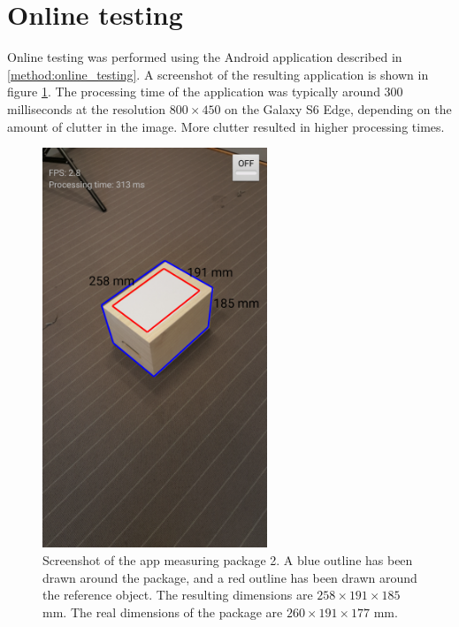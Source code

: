 \section{Online testing} \label{results:online}

Online testing was performed using the Android application described in \ref{method:online_testing}.
A screenshot of the resulting application is shown in figure \ref{fig:screenshot}. %
The processing time of the application was typically around 300 milliseconds at the resolution $800 \times 450$ on the Galaxy S6 Edge, depending on the amount of clutter in the image. 
More clutter resulted in higher processing times.


\begin{figure}[H]
\begin{center}
\includegraphics[width=0.6\textwidth]{figures/screenshot.png}
\end{center}
\caption{Screenshot of the app measuring package 2. A blue outline has been drawn around the package, and a red outline has been drawn around the reference object. The resulting dimensions are $258 \times 191 \times 185$ mm. The real dimensions of the package are $260 \times 191 \times 177$ mm.}
\label{fig:screenshot}
\end{figure}

